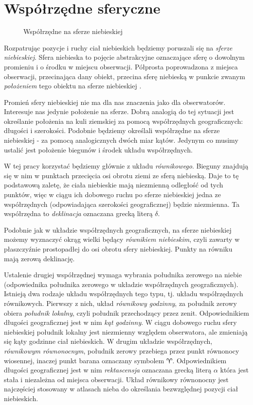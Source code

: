 \section{Współrzędne sferyczne}

\begin{figure}
\label{fig_sfera}

\caption{Współrzędne na sferze niebieskiej}
\end{figure}

Rozpatrując pozycje i ruchy ciał niebieskich będziemy poruszali się na
\emph{sferze niebieskiej}. Sfera niebieska to pojęcie abstrakcyjne oznaczające
sferę o dowolnym promieniu i o środku w miejscu obserwacji.  Półprosta
poprowadzona z miejsca obserwacji, przecinająca dany obiekt, przecina sferę
niebieską w punkcie zwanym \emph{położeniem} tego obiektu na sferze niebieskiej
\cite{rybka}.

Promień sfery niebieskiej nie ma dla nas znaczenia jako dla obserwatorów.
Interesuje nas jedynie położenie na sferze. Dobrą analogią do tej sytuacji jest
określanie położenia na kuli ziemskiej za pomocą współrzędnych geograficznych:
długości i szerokości. Podobnie będziemy określali współrzędne na sferze
niebieskiej - za pomocą analogicznych dwóch miar kątów. Jedynym co musimy
ustalić jest położenie biegunów i środek układu współrzędnych.

W tej pracy korzystać będziemy głównie z układu \emph{równikowego}. Bieguny
znajdują się w nim w punktach przecięcia osi obrotu ziemi ze sferą niebieską.
Daje to tę podstawową zaletę, że ciała niebieskie mają niezmienną odległość od
tych punktów, więc w ciągu ich dobowego ruchu po sferze niebieskiej jedna ze
współrzędnych (odpowiadająca szerokości geograficznej) będzie niezmienna. Ta
współrzędna to \emph{deklinacja} oznaczana grecką literą $\delta$.

Podobnie jak w układzie współrzędnych geograficznych, na sferze niebieskiej
możemy wyznaczyć okrąg wielki będący \emph{równikiem niebieskim}, czyli zawarty
w płaszczyźnie prostopadłej do osi obrotu sfery niebieskiej. Punkty na równiku
mają zerową deklinację.

Ustalenie drugiej współrzędnej wymaga wybrania południka zerowego na niebie
(odpowiednika południka zerowego w układzie współrzędnych geograficznych).
Istnieją dwa rodzaje układu współrzędnych tego typu, tj. układu współrzędnych
równikowych.  Pierwszy z nich, układ \emph{równikowy godzinny}, za południk
zerowy obiera \emph{południk lokalny}, czyli południk przechodzący przez zenit.
Odpowiednikiem długości geograficznej jest w nim \emph{kąt godzinny}. W ciągu
dobowego ruchu sfery niebieskiej południk lokalny jest niezmienny względem
obserwatora, ale zmieniają się kąty godzinne ciał niebieskich. W drugim układzie
współrzędnych, \emph{równikowym równonocnym}, południk zerowy przebiega przez
punkt równonocy wiosennej, inaczej punkt barana oznaczany symbolem $\aries$.
Odpowiednikiem długości geograficznej jest w nim \emph{rektascensja} oznaczana
grecką literą $\alpha$ która jest stała i niezależna od miejsca obserwacji.
Układ równikowy równonocny jest najczęściej stosowany w atlasach nieba do
określania bezwzględnej pozycji ciał niebieskich.

